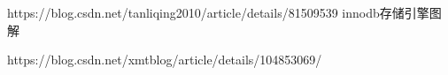 https://blog.csdn.net/tanliqing2010/article/details/81509539
innodb存储引擎图解

https://blog.csdn.net/xmtblog/article/details/104853069/
